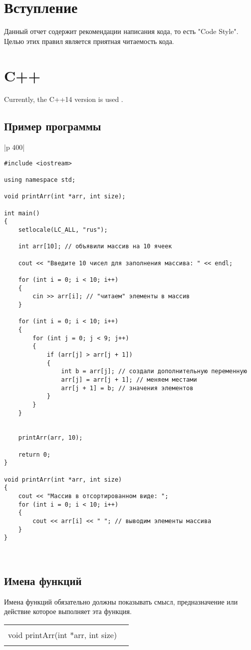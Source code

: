 \documentclass{article}
\begin{document}
\section{Вступление}
Данный отчет содержит рекомендации написания кода, то есть "Code Style". 
Целью этих правил является приятная читаемость кода. 
\section{C++}
Currently, the C++14 version is used \cite{CPP}.
\subsection{Пример программы}

\begin{tabular}{|p {400}|}
\hline
\begin{verbatim}
#include <iostream>
 
using namespace std;

void printArr(int *arr, int size);

int main() 
{
    setlocale(LC_ALL, "rus");
 
    int arr[10]; // объявили массив на 10 ячеек
 
    cout << "Введите 10 чисел для заполнения массива: " << endl;
 
    for (int i = 0; i < 10; i++) 
    {
        cin >> arr[i]; // "читаем" элементы в массив
    }
 
    for (int i = 0; i < 10; i++) 
    {
        for (int j = 0; j < 9; j++) 
        {
            if (arr[j] > arr[j + 1]) 
            {
                int b = arr[j]; // создали дополнительную переменную
                arr[j] = arr[j + 1]; // меняем местами
                arr[j + 1] = b; // значения элементов
            }
        }
    }
 
    
    printArr(arr, 10);

    return 0;
}

void printArr(int *arr, int size)
{
    cout << "Массив в отсортированном виде: ";
    for (int i = 0; i < 10; i++) 
    {
        cout << arr[i] << " "; // выводим элементы массива
    }
}
\end{verbatim}
\\
\hline      
\end{tabular}

\subsection{Имена функций}
Имена функций обязательно должны показывать смысл, предназначение или действие которое выполняет эта функция.\\
\begin{tabular}{|c|c}
\hline
    \\
    void printArr(int *arr, int size)\\
    \\
\hline      
\end{tabular}
\end{document}
